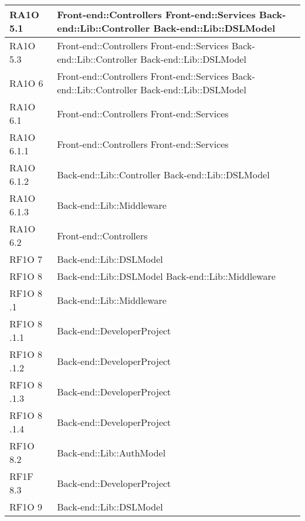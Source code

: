 \begin{center}
\begin{longtable}{|p{3cm}|p{5cm}|}
	  RA1O 5.1 & Front-end::Controllers \newline
	  			Front-end::Services \newline
	  			Back-end::Lib::Controller \newline
	  			Back-end::Lib::DSLModel \\ \hline
	  RA1O 5.3 & Front-end::Controllers \newline
	  			Front-end::Services \newline
	  			Back-end::Lib::Controller \newline
	  			Back-end::Lib::DSLModel \\ \hline
	  RA1O 6 & Front-end::Controllers \newline
	  			Front-end::Services \newline
	  			Back-end::Lib::Controller \newline
	  			Back-end::Lib::DSLModel \\ \hline
	  RA1O 6.1 & Front-end::Controllers \newline
	  			Front-end::Services \\ \hline
	  RA1O 6.1.1 & Front-end::Controllers \newline
	  			Front-end::Services \\ \hline
	  RA1O 6.1.2	 & Back-end::Lib::Controller \newline
	  			Back-end::Lib::DSLModel \\ \hline
	  RA1O 6.1.3 & Back-end::Lib::Middleware \\ \hline
	  RA1O 6.2 & Front-end::Controllers \\ \hline
      RF1O 7 & Back-end::Lib::DSLModel \\ \hline
      RF1O 8	 & Back-end::Lib::DSLModel \newline     
      			Back-end::Lib::Middleware \\ \hline
      RF1O 8	.1 & Back-end::Lib::Middleware \\ \hline
      RF1O 8	.1.1 & Back-end::DeveloperProject \\ \hline
      RF1O 8	.1.2 & Back-end::DeveloperProject \\ \hline
      RF1O 8	.1.3 & Back-end::DeveloperProject \\ \hline
      RF1O 8	.1.4 & Back-end::DeveloperProject \\ \hline
      RF1O 8.2 & Back-end::Lib::AuthModel \\ \hline
      RF1F 8.3 & Back-end::DeveloperProject \\ \hline
      RF1O 9 & Back-end::Lib::DSLModel \\ \hline

\end{longtable}
\end{center}
